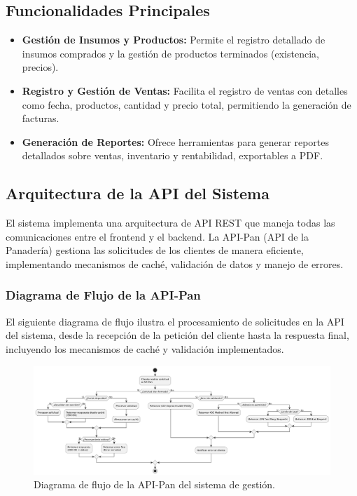 \documentclass[conference]{IEEEtran}
\begin{document}
\subsection{Funcionalidades Principales}
\begin{itemize}
    \item \textbf{Gestión de Insumos y Productos:} Permite el registro detallado de insumos comprados y la gestión de productos terminados (existencia, precios).
    \item \textbf{Registro y Gestión de Ventas:} Facilita el registro de ventas con detalles como fecha, productos, cantidad y precio total, permitiendo la generación de facturas.
    \item \textbf{Generación de Reportes:} Ofrece herramientas para generar reportes detallados sobre ventas, inventario y rentabilidad, exportables a PDF.
\end{itemize}

\subsection{Arquitectura de la API del Sistema}
El sistema implementa una arquitectura de API REST que maneja todas las comunicaciones entre el frontend y el backend. La API-Pan (API de la Panadería) gestiona las solicitudes de los clientes de manera eficiente, implementando mecanismos de caché, validación de datos y manejo de errores.

\subsubsection{Diagrama de Flujo de la API-Pan}
El siguiente diagrama de flujo ilustra el procesamiento de solicitudes en la API del sistema, desde la recepción de la petición del cliente hasta la respuesta final, incluyendo los mecanismos de caché y validación implementados.

\begin{figure}[htbp]
\centerline{\includegraphics[width=0.9\columnwidth]{images/diagrama_api.png}}
\caption{Diagrama de flujo de la API-Pan del sistema de gestión.}
\label{fig:api_pan}
\end{figure}
\end{document}
